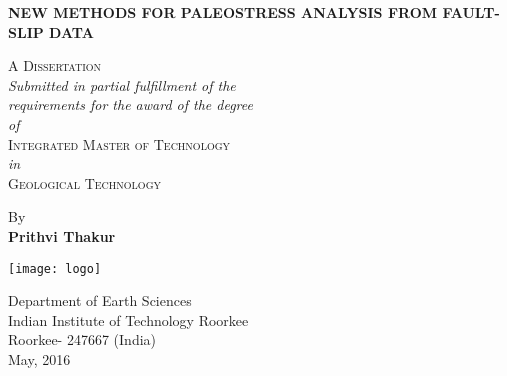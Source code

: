 \renewcommand{\baselinestretch}{1.0}
\begin{titlepage}
    \begin{center}
        \vspace*{1cm}
        
        \Huge
        \textbf{NEW METHODS FOR PALEOSTRESS ANALYSIS FROM FAULT-SLIP DATA}
        
        \vspace{0.5cm}
        
        \Large
        \textsc{A Dissertation}\\
        \vspace{0.5cm}
        \normalsize
        \emph{Submitted in partial fulfillment of the}\\ 
        \emph{requirements for the award of the degree}\\
        \emph{of}\\
        \textsc{Integrated Master of Technology}\\
        \emph{in}\\
        \textsc{Geological Technology}
        \vspace{1.5cm}
        
        By\\
        \textbf{Prithvi Thakur}
        
        
        \vspace{0.8cm}
        
        \texttt{[image: logo]}
        
        \vspace{0.5cm}
        Department of Earth Sciences\\
        Indian Institute of Technology Roorkee\\
        Roorkee- 247667 (India)\\
        May, 2016
        
    \end{center}
\end{titlepage}